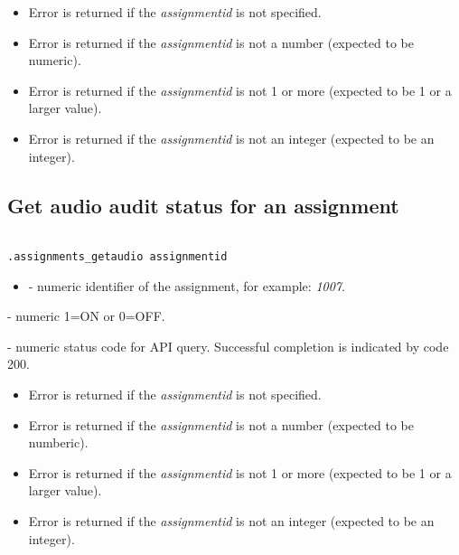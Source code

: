 \errheader
\begin{itemize}
    \item Error  is returned if the \textit{assignmentid} is not specified.
    \item Error  is returned if the \textit{assignmentid} is not a number (expected to be numeric).
    \item Error  is returned if the \textit{assignmentid} is not 1 or more (expected to be 1 or a larger value).
    \item Error  is returned if the \textit{assignmentid} is not an integer (expected to be an integer).
\end{itemize}


\subsection{Get audio audit status for an assignment}

\begin{lstlisting}[style=CommandLineStyle, showlines=true]

.assignments_getaudio assignmentid

\end{lstlisting}

\paramsheader
\begin{itemize}
    \item {} - numeric identifier of the assignment, for example: \textit{1007}.
\end{itemize}

\savedres
\begin{compactitem}
    \item {} - numeric 1=ON or 0=OFF.
    \item {}  - numeric status code for API query. Successful completion is indicated by code 200.
\end{compactitem}

\errheader
\begin{itemize}
    \item Error  is returned if the \textit{assignmentid} is not specified.
    \item Error  is returned if the \textit{assignmentid} is not a number (expected to be numberic).
    \item Error  is returned if the \textit{assignmentid} is not 1 or more (expected to be 1 or a larger value).
    \item Error  is returned if the \textit{assignmentid} is not an integer (expected to be an integer).
\end{itemize}

